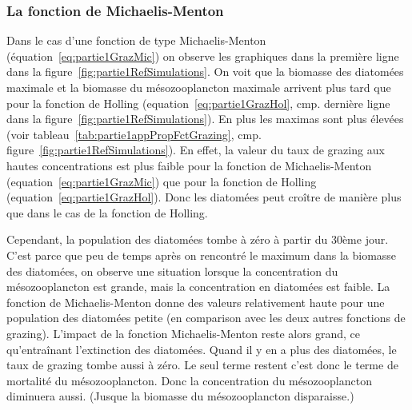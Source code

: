 {\subsubsection{La fonction de Michaelis-Menton}
\par{
Dans le cas d'une fonction de type Michaelis-Menton (équation~\ref{eq:partie1GrazMic}) on observe les
graphiques dans la première ligne dans la figure~\ref{fig:partie1RefSimulations}. On voit que
la biomasse des diatomées maximale et la biomasse du mésozooplancton maximale arrivent plus tard que
pour la fonction de Holling (equation~\ref{eq:partie1GrazHol}, cmp. dernière ligne dans la
figure~\ref{fig:partie1RefSimulations}). En plus les maximas sont plus élevées (voir
tableau~\ref{tab:partie1appPropFctGrazing}, cmp. figure~\ref{fig:partie1RefSimulations}).
En effet, la valeur du taux de grazing aux hautes concentrations est plus faible pour la fonction de
Michaelis-Menton (equation~\ref{eq:partie1GrazMic}) que pour la fonction de Holling
(equation~\ref{eq:partie1GrazHol}). Donc les diatomées peut croître de manière plus que dans le cas de
la fonction de Holling.
}
\par{
Cependant, la population des diatomées tombe à zéro à partir du 30ème jour. C'est parce que peu de
temps après on rencontré le maximum dans la biomasse des diatomées, on observe une situation lorsque
la concentration du mésozooplancton est grande, mais la concentration en diatomées est faible.
La fonction de Michaelis-Menton donne des valeurs relativement haute pour une population des diatomées
petite (en comparison avec les deux autres fonctions de grazing). L'impact de la fonction Michaelis-Menton
reste alors grand, ce qu'entraînant l'extinction des diatomées. Quand il y en a plus des diatomées,
le taux de grazing tombe aussi à zéro. Le seul terme restent c'est donc le terme de mortalité du
mésozooplancton. Donc la concentration du mésozooplancton diminuera aussi. (Jusque la biomasse du
mésozooplancton disparaisse.)
}
}
